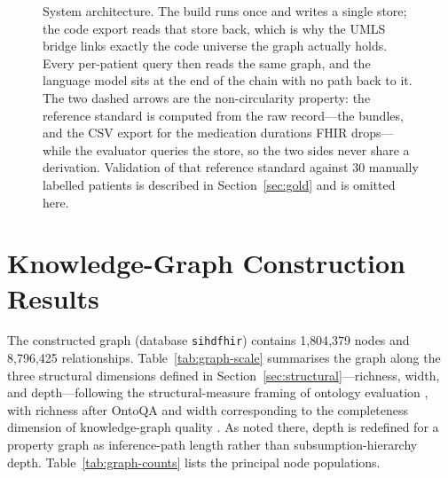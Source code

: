 \begin{figure}[htbp]
{}
\caption{System architecture. The build runs once and writes a single store;
the code export reads that store back, which is why the UMLS bridge links exactly the code
universe the graph actually holds. Every per-patient query then reads the same graph, and
the language model sits at the end of the chain with no path back to it. The two dashed
arrows are the non-circularity property: the reference standard is computed from the raw
record---the bundles, and the CSV export for the medication durations FHIR drops---while
the evaluator queries the store, so the two sides never share a derivation. Validation of
that reference standard against 30 manually labelled patients is described in
Section~\ref{sec:gold} and is omitted here.}
\label{fig:architecture}
\end{figure}

\section{Knowledge-Graph Construction Results}
\label{sec:kg-results}

The constructed graph (database \texttt{sihdfhir}) contains
1{,}804{,}379 nodes and 8{,}796{,}425 relationships.
Table~\ref{tab:graph-scale} summarises the graph along the three structural dimensions
defined in Section~\ref{sec:structural}---richness, width, and depth---following the
structural-measure framing of ontology evaluation \cite{gangemi2006}, with richness after
OntoQA \cite{tartir2005} and width corresponding to the completeness dimension of
knowledge-graph quality \cite{issa2021}. As noted there, depth is redefined for a property
graph as inference-path length rather than subsumption-hierarchy depth.
Table~\ref{tab:graph-counts} lists the principal node populations.

